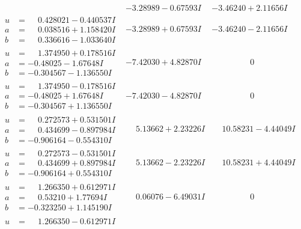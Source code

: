 \documentclass[1p]{elsarticle_modified}
\theoremstyle{definition}
\begin{document}
$$\begin{array}{c|c|c}
 & -3.28989 - 0.67593 I & -3.46240 + 2.11656 I \\ \hline\begin{aligned}
u &= \phantom{-}0.428021 - 0.440537 I \\
a &= \phantom{-}0.038516 + 1.158420 I \\
b &= \phantom{-}0.336616 - 1.033640 I\end{aligned}
 & -3.28989 + 0.67593 I & -3.46240 - 2.11656 I \\ \hline\begin{aligned}
u &= \phantom{-}1.374950 + 0.178516 I \\
a &= -0.48025 - 1.67648 I \\
b &= -0.304567 - 1.136550 I\end{aligned}
 & -7.42030 + 4.82870 I & \phantom{-0.000000 } 0 \\ \hline\begin{aligned}
u &= \phantom{-}1.374950 - 0.178516 I \\
a &= -0.48025 + 1.67648 I \\
b &= -0.304567 + 1.136550 I\end{aligned}
 & -7.42030 - 4.82870 I & \phantom{-0.000000 } 0 \\ \hline\begin{aligned}
u &= \phantom{-}0.272573 + 0.531501 I \\
a &= \phantom{-}0.434699 - 0.897984 I \\
b &= -0.906164 - 0.554310 I\end{aligned}
 & \phantom{-}5.13662 + 2.23226 I & \phantom{-}10.58231 - 4.44049 I \\ \hline\begin{aligned}
u &= \phantom{-}0.272573 - 0.531501 I \\
a &= \phantom{-}0.434699 + 0.897984 I \\
b &= -0.906164 + 0.554310 I\end{aligned}
 & \phantom{-}5.13662 - 2.23226 I & \phantom{-}10.58231 + 4.44049 I \\ \hline\begin{aligned}
u &= \phantom{-}1.266350 + 0.612971 I \\
a &= \phantom{-}0.53210 + 1.77694 I \\
b &= -0.323250 + 1.145190 I\end{aligned}
 & \phantom{-}0.06076 - 6.49031 I & \phantom{-0.000000 } 0 \\ \hline\begin{aligned}
u &= \phantom{-}1.266350 - 0.612971 I \\

\end{aligned}
\end{array}$$
\end{document}
